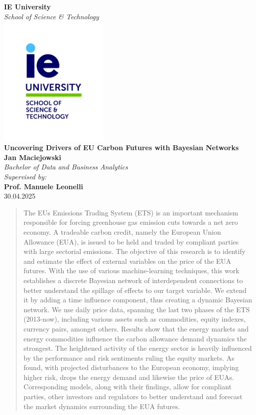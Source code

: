 \documentclass[12pt, letterpaper]{article}
\begin{document}
\begin{titlepage}
    \centering
    \Large\textbf{IE University}\\[0.5cm]
    \large\textit{School of Science \& Technology}\\[1.5cm] 
    \includegraphics[width=0.4\textwidth]{graphics/SST.png}\\ 
    \Huge\textbf{Uncovering Drivers of EU Carbon Futures with Bayesian Networks}\\[0.5cm] 
    \Large\textbf{Jan Maciejowski}\\ 
    \large\textit{Bachelor of Data and Business Analytics}\\[0.5cm] 
    \Large\textit{Supervised by:}\\
    \Large\textbf{Prof. Manuele Leonelli}\\
    \large 30.04.2025 \\[1cm] 
\end{titlepage}

\begin{abstract}
The EUs Emissions Trading System (ETS) is an important mechanism responsible for forcing greenhouse gas emission cuts towards a net zero economy. A tradeable carbon credit, namely the European Union Allowance (EUA), is issued to be held and traded by compliant parties with large sectorial emissions. The objective of this research is to identify and estimate the effect of external variables on the price of the EUA futures. With the use of various machine-learning techniques, this work establishes a discrete Bayesian network of interdependent connections to better understand the spillage of effects to our target variable. We extend it by adding a time influence component, thus creating a dynamic Bayesian network. We use daily price data, spanning the last two phases of the ETS (2013-now), including various assets such as commodities, equity indexes, currency pairs, amongst others. Results show that the energy markets and energy commodities influence the carbon allowance demand dynamics the strongest. The heightened activity of the energy sector is heavily influenced by the performance and risk sentiments ruling the equity markets. As found, with projected disturbances to the European economy, implying higher risk, drops the energy demand and likewise the price of EUAs. Corresponding models, along with their findings, allow for compliant parties, other investors and regulators to better understand and forecast the market dynamics surrounding the EUA futures. 
\end{abstract}
\end{document}
